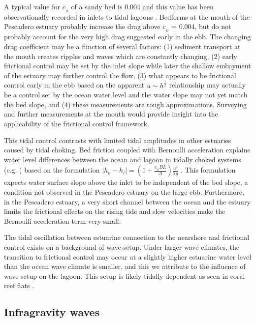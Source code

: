 A typical value for $c_{_D}$ of a sandy bed is 0.004 \parencite{soulsby_bottom_1983}
and this value has been observationally recorded in inlets to tidal
lagoons \parencite{rydberg_tidal_1996}. Bedforms at the mouth of
the Pescadero estuary probably increase the drag above $c_{_D}$ =
0.004, but do not probably account for the very high drag suggested
early in the ebb. The changing drag coefficient may be a function
of several factors: (1) sediment transport at the mouth creates ripples
and waves which are constantly changing, (2) early frictional control
may be set by the inlet slope while later the shallow embayment of
the estuary may further control the flow, (3) what appears to be frictional
control early in the ebb based on the apparent $\overline{u}\sim h^{\frac{1}{2}}$
relationship may actually be a control set by the ocean water level
and the water slope may not yet match the bed slope, and (4) these
measurements are rough approximations. Surveying and further measurements
at the mouth would provide insight into the applicability of the frictional
control framework. 

This tidal control contrasts with limited tidal amplitudes in other
estuaries caused by tidal choking. Bed friction coupled with Bernoulli
acceleration explains water level differences between the ocean and
lagoon in tidally choked systems (e.g. \cite{rydberg_tidal_1996,hill_fortnightly_1994})
 based on the formulation \emph{$\left|h_{o}-h_{i}\right|=\left(1+\frac{c_{_D}BL}{A}\right)\frac{u^{2}}{2g}$}
\parencite{stigebrandt_aspects_1980}. This formulation expects water
surface slope above the inlet to be independent of the bed slope,
a condition not observed in the Pescadero estuary on the large ebb.
Furthermore, in the Pescadero estuary, a very short channel between
the ocean and the estuary limits the frictional effects on the rising
tide and slow velocities make the Bernoulli acceleration term very
small. 

The tidal oscillation between estuarine connection to the nearshore
and frictional control exists on a background of wave setup. Under
larger wave climates, the transition to frictional control may occur
at a slightly higher estuarine water level than the ocean wave climate
is smaller, and this we attribute to the influence of wave setup on
the lagoon. This setup is likely tidally dependent as seen in coral
reef flats \parencite{becker_water_2014}.


\subsection{Infragravity waves}

